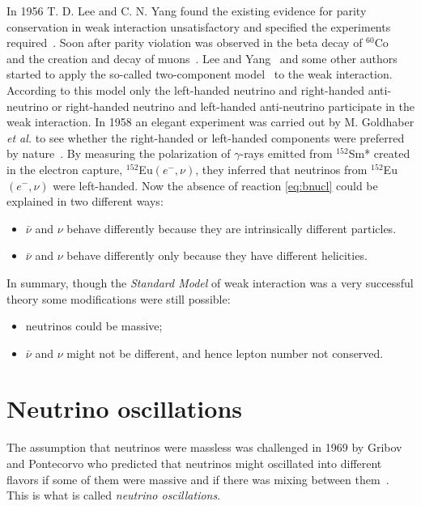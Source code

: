 In 1956 T. D. Lee and C. N. Yang found the existing evidence for parity conservation in weak interaction unsatisfactory and specified the experiments required~\cite{Lee56}. Soon after parity violation was observed in the beta decay of $^{60}$Co~\cite{Wu57} and the creation and decay of muons~\cite{Gar57,Fri57}. Lee and Yang~\cite{Lee57} and some other authors~\cite{Sal57,Lan57} started to apply the so-called two-component model~\cite{Wey29} to the weak interaction. According to this model only the left-handed neutrino and right-handed anti-neutrino or right-handed neutrino and left-handed anti-neutrino participate in the weak interaction. In 1958 an elegant experiment was carried out by M. Goldhaber \textit{et al.} to see whether the right-handed or left-handed components were preferred by nature~\cite{Gol58}. By measuring the polarization of $\gamma$-rays emitted from $^{152}$Sm* created in the electron capture, $^{152}$Eu$(e^-,\nu)$, they inferred that neutrinos from $^{152}$Eu$(e^-,\nu)$ were left-handed. Now the absence of reaction \ref{eq:bnucl} could be explained in two different ways:
\begin{itemize}
\item $\bar{\nu}$ and $\nu$ behave differently because they are   intrinsically different particles.
\item $\bar{\nu}$ and $\nu$ behave differently only because they have   different helicities.
\end{itemize}

In summary, though the \emph{Standard Model} of weak interaction was a very successful theory some modifications were still possible:
\begin{itemize}
\item neutrinos could be massive;
\item $\bar{\nu}$ and $\nu$ might not be different, and hence lepton   number not conserved.
\end{itemize}


\section{Neutrino oscillations}
\label{sec:osci}
The assumption that neutrinos were massless was challenged in 1969 by Gribov and Pontecorvo who predicted that neutrinos might oscillated into different flavors if some of them were massive and if there was mixing between them~\cite{Gri69}. This is what is called \emph{neutrino oscillations}.

